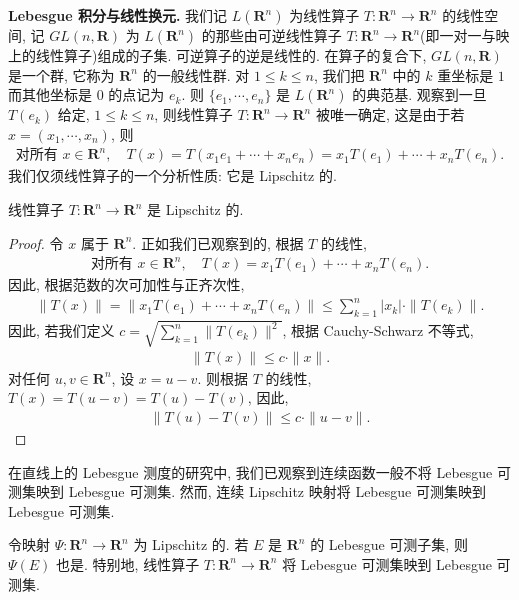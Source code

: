 \documentclass[../../main.tex]{subfiles}
\begin{document}
\textbf{Lebesgue 积分与线性换元.} 我们记 $L(\mathbf{R}^{n})$ 为线性算子 $T:\mathbf{R}^{n}\to\mathbf{R}^{n}$ 的线性空间, 记 $GL(n,\mathbf{R})$ 为 $L(\mathbf{R}^{n})$ 的那些由可逆线性算子 $T:\mathbf{R}^{n}\to\mathbf{R}^{n}$(即一对一与映上的线性算子)组成的子集. 可逆算子的逆是线性的. 在算子的复合下, $GL(n,\mathbf{R})$ 是一个群, 它称为 $\mathbf{R}^{n}$ 的一般线性群. 对 $1\leqslant k\leqslant n$, 我们把 $\mathbf{R}^{n}$ 中的 $k$ 重坐标是 $1$ 而其他坐标是 $0$ 的点记为 $e_{k}$. 则 $\{e_{1},\cdots,e_{n}\}$ 是 $L(\mathbf{R}^{n})$ 的典范基. 观察到一旦 $T(e_{k})$ 给定, $1\leqslant k\leqslant n$, 则线性算子 $T:\mathbf{R}^{n}\to\mathbf{R}^{n}$ 被唯一确定, 这是由于若 $x=(x_{1},\cdots,x_{n})$, 则
\begin{align*}
\text{对所有 }x\in\mathbf{R}^{n},\quad T(x)=T(x_{1}e_{1}+\cdots+x_{n}e_{n})=x_{1}T(e_{1})+\cdots+x_{n}T(e_{n}).
\end{align*}
我们仅须线性算子的一个分析性质: 它是 Lipschitz 的.

\begin{proposition}\label{proposition:ch20-线性算子lipschitz}
线性算子 $T:\mathbf{R}^{n}\to\mathbf{R}^{n}$ 是 Lipschitz 的.
\end{proposition}

\begin{proof}
令 $x$ 属于 $\mathbf{R}^{n}$. 正如我们已观察到的, 根据 $T$ 的线性,
\begin{align*}
\text{对所有 }x\in\mathbf{R}^{n},\quad T(x)=x_{1}T(e_{1})+\cdots+x_{n}T(e_{n}).
\end{align*}
因此, 根据范数的次可加性与正齐次性,
\begin{align*}
\|T(x)\|=\|x_{1}T(e_{1})+\cdots+x_{n}T(e_{n})\|\leqslant\sum_{k=1}^{n}|x_{k}|\cdot\|T(e_{k})\|.
\end{align*}
因此, 若我们定义 $c=\sqrt{\sum_{k=1}^{n}\|T(e_{k})\|^{2}}$, 根据 Cauchy-Schwarz 不等式,
\begin{align*}
\|T(x)\|\leqslant c\cdot\|x\|.
\end{align*}
对任何 $u,v\in\mathbf{R}^{n}$, 设 $x=u-v$. 则根据 $T$ 的线性, $T(x)=T(u-v)=T(u)-T(v)$, 因此,
\begin{align*}
\|T(u)-T(v)\|\leqslant c\cdot\|u-v\|.
\end{align*}
\end{proof}

在直线上的 Lebesgue 测度的研究中, 我们已观察到连续函数一般不将 Lebesgue 可测集映到 Lebesgue 可测集. 然而, 连续 Lipschitz 映射将 Lebesgue 可测集映到 Lebesgue 可测集.

\begin{proposition}\label{proposition:ch20-lipschitz可测}
令映射 $\Psi:\mathbf{R}^{n}\to\mathbf{R}^{n}$ 为 Lipschitz 的. 若 $E$ 是 $\mathbf{R}^{n}$ 的 Lebesgue 可测子集, 则 $\Psi(E)$ 也是. 特别地, 线性算子 $T:\mathbf{R}^{n}\to\mathbf{R}^{n}$ 将 Lebesgue 可测集映到 Lebesgue 可测集.
\end{proposition}
\end{document}
